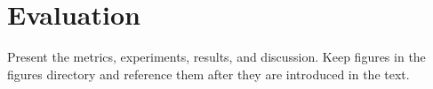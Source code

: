 \section{Evaluation}

Present the metrics, experiments, results, and discussion. Keep figures in
the figures directory and reference them after they are introduced in the
text.
